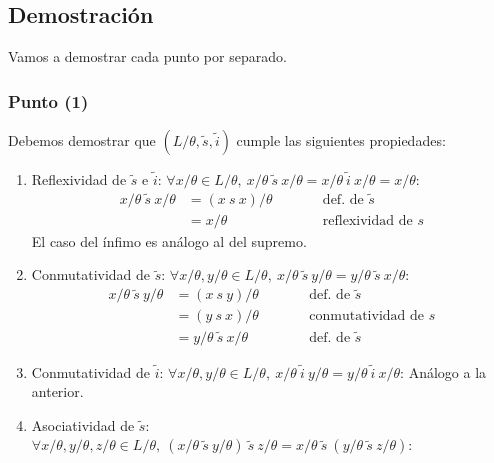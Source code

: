 \documentclass{article}
\begin{document}
\subsection*{Demostración}
Vamos a demostrar cada punto por separado.

\subsubsection*{Punto (1)}
Debemos demostrar que $(L/\theta,\tilde{s},\tilde{i})$ cumple las siguientes propiedades:
\begin{enumerate}
  \item Reflexividad de $\tilde{s}$ e $\tilde{i}$: $\forall x/\theta\in L/\theta,\ x/\theta\ \tilde{s}\ x/\theta=x/\theta\ \tilde{i}\ x/\theta=x/\theta$:
        \begin{equation*}
          \begin{alignedat}{2}
            x/\theta\ \tilde{s}\ x/\theta & = (x\ s\ x)/\theta &  & \qquad\text{def. de }\tilde{s} \\
                                          & = x/\theta         &  & \qquad\text{reflexividad de }s
          \end{alignedat}
        \end{equation*}
        El caso del ínfimo es análogo al del supremo.
  \item Conmutatividad de $\tilde{s}$: $\forall x/\theta,y/\theta\in L/\theta,\ x/\theta\ \tilde{s}\ y/\theta=y/\theta\ \tilde{s}\ x/\theta$:
        \begin{equation*}
          \begin{alignedat}{2}
            x/\theta\ \tilde{s}\ y/\theta & = (x\ s\ y)/\theta              &  & \qquad\text{def. de }\tilde{s}   \\
                                          & = (y\ s\ x)/\theta              &  & \qquad\text{conmutatividad de }s \\
                                          & = y/\theta\ \tilde{s}\ x/\theta &  & \qquad\text{def. de }\tilde{s}
          \end{alignedat}
        \end{equation*}
  \item Conmutatividad de $\tilde{i}$: $\forall x/\theta,y/\theta\in L/\theta,\ x/\theta\ \tilde{i}\ y/\theta=y/\theta\ \tilde{i}\ x/\theta$: Análogo a la anterior.
  \item Asociatividad de $\tilde{s}$: $\forall x/\theta,y/\theta,z/\theta\in L/\theta,\ (x/\theta\ \tilde{s}\ y/\theta)\ \tilde{s}\ z/\theta=x/\theta\ \tilde{s}\ (y/\theta\ \tilde{s}\ z/\theta)$:

\end{enumerate}
\end{document}

